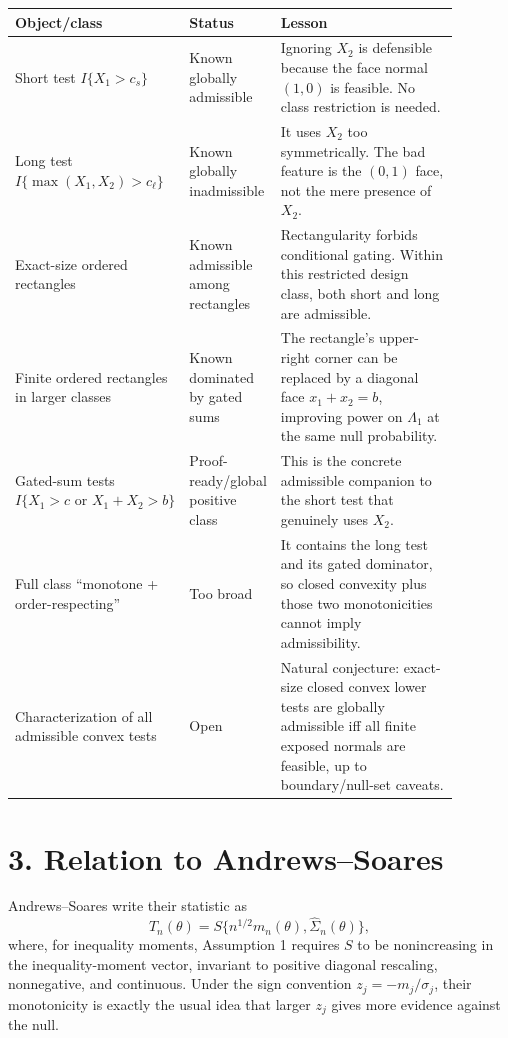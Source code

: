 \documentclass[10pt]{article}
\begin{document}
\begin{center}
\begin{tabular}{p{0.23\linewidth}p{0.19\linewidth}p{0.46\linewidth}}
\toprule
Object/class & Status & Lesson \\
\midrule
Short test $I\{X_1>c_s\}$ & Known globally admissible & Ignoring $X_2$ is defensible because the face normal $(1,0)$ is feasible. No class restriction is needed. \\
Long test $I\{\max(X_1,X_2)>c_\ell\}$ & Known globally inadmissible & It uses $X_2$ too symmetrically. The bad feature is the $(0,1)$ face, not the mere presence of $X_2$. \\
Exact-size ordered rectangles & Known admissible among rectangles & Rectangularity forbids conditional gating. Within this restricted design class, both short and long are admissible. \\
Finite ordered rectangles in larger classes & Known dominated by gated sums & The rectangle's upper-right corner can be replaced by a diagonal face $x_1+x_2=b$, improving power on $\Lambda_1$ at the same null probability. \\
Gated-sum tests $I\{X_1>c\text{ or }X_1+X_2>b\}$ & Proof-ready/global positive class & This is the concrete admissible companion to the short test that genuinely uses $X_2$. \\
Full class ``monotone + order-respecting'' & Too broad & It contains the long test and its gated dominator, so closed convexity plus those two monotonicities cannot imply admissibility. \\
Characterization of all admissible convex tests & Open & Natural conjecture: exact-size closed convex lower tests are globally admissible iff all finite exposed normals are feasible, up to boundary/null-set caveats. \\
\bottomrule
\end{tabular}
\end{center}

\section*{3. Relation to Andrews--Soares}

Andrews--Soares write their statistic as
\[
T_n(\theta)=S\{n^{1/2}m_n(\theta),\widehat\Sigma_n(\theta)\},
\]
where, for inequality moments, Assumption 1 requires $S$ to be nonincreasing in the inequality-moment vector, invariant to positive diagonal rescaling, nonnegative, and continuous.  Under the sign convention $z_j=-m_j/\sigma_j$, their monotonicity is exactly the usual idea that larger $z_j$ gives more evidence against the null.
\end{document}
